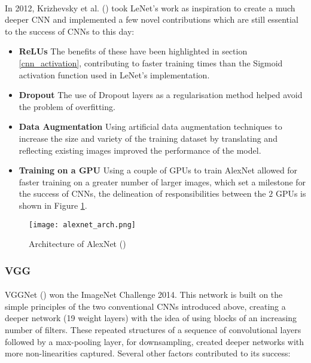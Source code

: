 \paragraph{}
In 2012, Krizhevsky et al. (\cite{10.5555/2999134.2999257}) took LeNet's work as inspiration to create a much deeper \gls{CNN} and implemented a few novel contributions which are still essential to the success of \gls{CNN}s to this day:
\begin{itemize}
    \item \textbf{\gls{ReLU}s} The benefits of these have been highlighted in section \ref{cnn_activation}, contributing to faster training times than the Sigmoid activation function used in LeNet's implementation.
    \item \textbf{Dropout} The use of Dropout layers as a regularisation method helped avoid the problem of overfitting.
    \item \textbf{Data Augmentation} Using artificial data augmentation techniques to increase the size and variety of the training dataset by translating and reflecting existing images improved the performance of the model.
     \item \textbf{Training on a \gls{GPU}} Using a couple of \gls{GPU}s to train AlexNet allowed for faster training on a greater number of larger images, which set a milestone for the success of \gls{CNN}s, the delineation of responsibilities between the $2$ \gls{GPU}s is shown in Figure \ref{fig_alexnet}.
\end{itemize}

    \begin{figure}[hbt!]
        \centering
        \texttt{[image: alexnet\_arch.png]}
        \caption{Architecture of AlexNet (\cite{10.5555/2999134.2999257})}
        \label{fig_alexnet}
    \end{figure}


\subsubsection{VGG}
\paragraph{}
VGGNet (\cite{simonyan2014deep}) won the ImageNet Challenge 2014. This network is built on the simple principles of the two conventional \gls{CNN}s introduced above, creating a deeper network (19 weight layers) with the idea of using blocks of an increasing number of filters. These repeated structures of a sequence of convolutional layers followed by a max-pooling layer, for downsampling, created deeper networks with more non-linearities captured. Several other factors contributed to its success:

